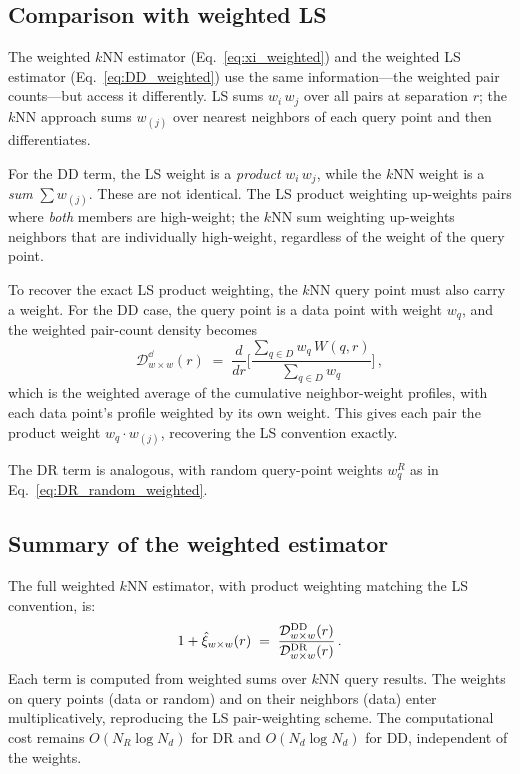 \subsection{Comparison with weighted LS}
\label{sec:weight_comparison}

The weighted $k$NN estimator (Eq.~\ref{eq:xi_weighted}) and the weighted LS estimator (Eq.~\ref{eq:DD_weighted}) use the same information---the weighted pair counts---but access it differently.  LS sums $w_i\,w_j$ over all pairs at separation $r$; the $k$NN approach sums $w_{(j)}$ over nearest neighbors of each query point and then differentiates.

For the DD term, the LS weight is a \emph{product} $w_i\,w_j$, while the $k$NN weight is a \emph{sum} $\sum w_{(j)}$.  These are not identical.  The LS product weighting up-weights pairs where \emph{both} members are high-weight; the $k$NN sum weighting up-weights neighbors that are individually high-weight, regardless of the weight of the query point.

To recover the exact LS product weighting, the $k$NN query point must also carry a weight.  For the DD case, the query point is a data point with weight $w_q$, and the weighted pair-count density becomes
\begin{equation}
  \mathcal{D}^{\dd}_{w \times w}(r) \;=\; \frac{d}{dr}\Biggl[\frac{\sum_{q \in D} w_q\,W(q, r)}{\sum_{q \in D} w_q}\Biggr]\,,
  \label{eq:DD_product_weighted}
\end{equation}
which is the weighted average of the cumulative neighbor-weight profiles, with each data point's profile weighted by its own weight.  This gives each pair the product weight $w_q \cdot w_{(j)}$, recovering the LS convention exactly.

The DR term is analogous, with random query-point weights $w_q^R$ as in Eq.~\eqref{eq:DR_random_weighted}.

\subsection{Summary of the weighted estimator}
\label{sec:weight_summary}

The full weighted $k$NN estimator, with product weighting matching the LS convention, is:
\begin{equation}
  1 + \hat{\xi}_{w \times w}(r) \;=\; \frac{\mathcal{D}^{\mathrm{DD}}_{w \times w}(r)}{\mathcal{D}^{\mathrm{DR}}_{w \times w}(r)}\,.
  \label{eq:xi_full_weighted}
\end{equation}
Each term is computed from weighted sums over $k$NN query results.  The weights on query points (data or random) and on their neighbors (data) enter multiplicatively, reproducing the LS pair-weighting scheme.  The computational cost remains $O(N_R \log N_d)$ for DR and $O(N_d \log N_d)$ for DD, independent of the weights.
